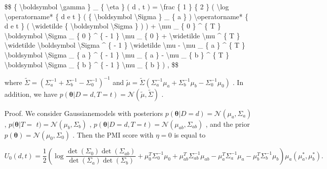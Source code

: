 {\$\$ \{ \textbackslash boldsymbol \textbackslash gamma \} \_ \{
\textbackslash eta \} ( d , t ) = \textbackslash frac \{ 1 \} \{ 2 \} (
\textbackslash log \textbackslash operatorname* \{ d e t \} ( \{
\textbackslash boldsymbol \textbackslash Sigma \} \_ \{ a \} )
\textbackslash operatorname* \{ d e t \} ( \textbackslash widetilde \{
\textbackslash boldsymbol \textbackslash Sigma \} ) ) +
\textbackslash mu \_ \{ 0 \} \^{} \{ T \} \textbackslash boldsymbol
\textbackslash Sigma \_ \{ 0 \} \^{} \{ - 1 \} \textbackslash mu \_ \{ 0
\} + \textbackslash widetilde \textbackslash mu \^{} \{ T \}
\textbackslash widetilde \textbackslash boldsymbol \textbackslash Sigma
\^{} \{ - 1 \} \textbackslash widetilde \textbackslash mu -
\textbackslash mu \_ \{ a \} \^{} \{ T \} \textbackslash boldsymbol
\textbackslash Sigma \_ \{ a \} \^{} \{ - 1 \} \textbackslash mu \_ \{ a
\} - \textbackslash mu \_ \{ b \} \^{} \{ T \} \textbackslash boldsymbol
\textbackslash Sigma \_ \{ b \} \^{} \{ - 1 \} \textbackslash mu \_ \{ b
\} ) , \$\$}

where
\(\widetilde \Sigma = ( \Sigma _ { a } ^ { - 1 } + \Sigma _ { b } ^ { - 1 } - \Sigma _ { 0 } ^ { - 1 } ) ^ { - 1 }\)
and
\(\widetilde { \mu } = \widetilde { \Sigma } \left( { \Sigma } _ { a } ^ { - 1 } \mu _ { a } + { \Sigma } _ { b } ^ { - 1 } \mu _ { b } - { \Sigma } _ { 0 } ^ { - 1 } \mu _ { 0 } \right)\)
. In addition, we have
\(p ( \pmb \theta | D = d , T = t ) = \mathcal N ( \widetilde \mu , \widetilde \Sigma )\)
.

Proof. We consider Gaussianemodels with posteriors
\(p ( \pmb \theta | D = d ) = \mathcal N ( \mu _ { a } , \Sigma _ { a } )\)
, \(p ( \pmb \theta | T =\)
\(t ) = \mathcal { N } ( \mu _ { b } , \Sigma _ { b } )\) ,
\(p ( \pmb \theta | D = d , T = t ) = \mathcal N ( \mu _ { a b } , \Sigma _ { a b } )\)
, and the prior
\(p ( \pmb \theta ) = \mathcal { N } ( \mu _ { 0 } , \Sigma _ { 0 } )\)
. Then the PMI score with \(\eta = 0\) is equal to

\[
U _ { 0 } ( d , t ) = { \frac { 1 } { 2 } } \left( \log { \frac { \operatorname* { d e t } ( \Sigma _ { 0 } ) \operatorname* { d e t } ( \Sigma _ { a b } ) } { \operatorname* { d e t } ( \Sigma _ { a } ) \operatorname* { d e t } ( \Sigma _ { b } ) } } + \mu _ { 0 } ^ { T } \Sigma _ { 0 } ^ { - 1 } \mu _ { 0 } + \mu _ { a b } ^ { T } \Sigma _ { a b } ^ { - 1 } \mu _ { a b } - \mu _ { a } ^ { T } \Sigma _ { a } ^ { - 1 } \mu _ { a } - \mu _ { b } ^ { T } \Sigma _ { b } ^ { - 1 } \mu _ { b } \right) \mu _ { a } \left( \mu _ { a } ^ { * } , \mu _ { b } ^ { * } \right) .
\]

